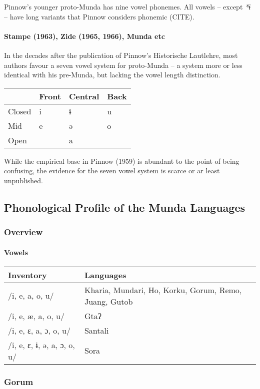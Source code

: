 \documentclass[a4paper,]{article}
\let\oldparagraph\paragraph
\renewcommand{\paragraph}[1]{\oldparagraph{#1}\mbox{}}
\begin{document}
Pinnow's younger proto-Munda has nine vowel phonemes. All vowels --
except \emph{*ɨ} -- have long variants that Pinnow considers phonemic
(CITE).

\paragraph{Stampe (1963), Zide (1965, 1966), Munda
etc}\label{stampe-1963-zide-1965-1966-munda-etc}

In the decades after the publication of Pinnow's Historische Lautlehre,
most authors favour a seven vowel system for proto-Munda -- a system
more or less identical with his pre-Munda, but lacking the vowel length
distinction.

\begin{longtable}[]{@{}llll@{}}
\toprule
& Front & Central & Back\tabularnewline
\midrule
\endhead
Closed & i & ɨ & u\tabularnewline
Mid & e & ə & o\tabularnewline
Open & & a &\tabularnewline
\bottomrule
\end{longtable}

While the empirical base in Pinnow (1959) is abundant to the point of
being confusing, the evidence for the seven vowel system is scarce or ar
least unpublished.

\subsection{Phonological Profile of the Munda
Languages}\label{phonological-profile-of-the-munda-languages}

\subsubsection{Overview}\label{overview}

\paragraph{Vowels}\label{vowels}

\begin{longtable}[]{@{}ll@{}}
\toprule
Inventory & Languages\tabularnewline
\midrule
\endhead
/i, e, a, o, u/ & Kharia, Mundari, Ho, Korku, Gorum, Remo, Juang,
Gutob\tabularnewline
/i, e, æ, a, o, u/ & Gtaʔ\tabularnewline
/i, e, ɛ, a, ɔ, o, u/ & Santali\tabularnewline
/i, e, ɛ, ɨ, ə, a, ɔ, o, u/ & Sora\tabularnewline
\bottomrule
\end{longtable}

\subsubsection{Gorum}\label{gorum}
\end{document}
